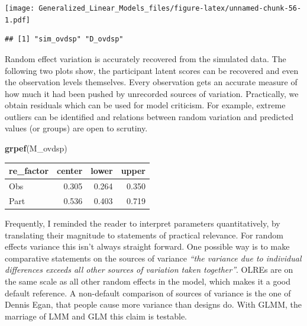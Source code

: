 \documentclass[]{svmono}
\newenvironment{Shaded}{\begin{snugshade}}{\end{snugshade}}
\newcommand{\KeywordTok}[1]{\textcolor[rgb]{0.13,0.29,0.53}{\textbf{#1}}}
\newcommand{\DataTypeTok}[1]{\textcolor[rgb]{0.13,0.29,0.53}{#1}}
\newcommand{\DecValTok}[1]{\textcolor[rgb]{0.00,0.00,0.81}{#1}}
\newcommand{\StringTok}[1]{\textcolor[rgb]{0.31,0.60,0.02}{#1}}
\newcommand{\OperatorTok}[1]{\textcolor[rgb]{0.81,0.36,0.00}{\textbf{#1}}}
\newcommand{\NormalTok}[1]{#1}
\theoremstyle{definition}
\theoremstyle{definition}
\theoremstyle{definition}
\theoremstyle{remark}
\begin{document}
\texttt{[image: Generalized\_Linear\_Models\_files/figure-latex/unnamed-chunk-56-1.pdf]}

\begin{verbatim}
## [1] "sim_ovdsp" "D_ovdsp"
\end{verbatim}

\begin{Shaded}
\end{Shaded}

Random effect variation is accurately recovered from the simulated data.
The following two plots show, the participant latent scores can be
recovered and even the observation levels themselves. Every observation
gets an accurate measure of how much it had been pushed by unrecorded
sources of variation. Practically, we obtain residuals which can be used
for model criticism. For example, extreme outliers can be identified and
relations between random variation and predicted values (or groups) are
open to scrutiny.

\begin{Shaded}
\begin{Highlighting}[]
\KeywordTok{grpef}\NormalTok{(M_ovdsp)}
\end{Highlighting}
\end{Shaded}

\begin{longtable}[]{@{}lrrr@{}}
\toprule
re\_factor & center & lower & upper\tabularnewline
\midrule
\endhead
Obs & 0.305 & 0.264 & 0.350\tabularnewline
Part & 0.536 & 0.403 & 0.719\tabularnewline
\bottomrule
\end{longtable}

Frequently, I reminded the reader to interpret parameters
quantitatively, by translating their magnitude to statements of
practical relevance. For random effects variance this isn't always
straight forward. One possible way is to make comparative statements on
the sources of variance \emph{``the variance due to individual
differences exceeds all other sources of variation taken together''}.
OLREs are on the same scale as all other random effects in the model,
which makes it a good default reference. A non-default comparison of
sources of variance is the one of Dennis Egan, that people cause more
variance than designs do. With GLMM, the marriage of LMM and GLM this
claim is testable.
\end{document}
